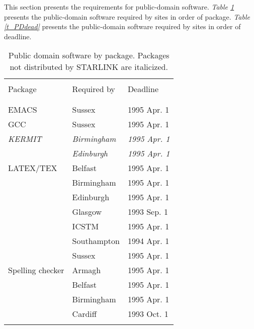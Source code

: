 This section presents the requirements for public-domain software.
{\em Table \ref{t_PDpack}} presents the public-domain software required by
sites in order of package.
{\em Table \ref{t_PDdead}} presents the public-domain software required by
sites in order of deadline.

\begin{table}
\begin{center}
\caption{Public domain software by package.
Packages not distributed by STARLINK are italicized.}
\vspace{5mm}
\begin{tabular}{|p{36mm}|p{50mm}|p{30mm}|} \hline \label{t_PDpack}
& & \\
Package & Required by & Deadline \\
& & \\ \hline
& & \\
EMACS            & Sussex           & 1995 Apr. 1 \\
GCC              & Sussex           & 1995 Apr. 1 \\
{\em KERMIT}     & {\em Birmingham} & {\em 1995 Apr. 1} \\
                 & {\em Edinburgh}  & {\em 1995 Apr. 1} \\
LATEX/TEX        & Belfast          & 1995 Apr. 1 \\
                 & Birmingham       & 1995 Apr. 1 \\
                 & Edinburgh        & 1995 Apr. 1 \\
                 & Glasgow          & 1993 Sep. 1 \\
                 & ICSTM            & 1995 Apr. 1 \\
                 & Southampton      & 1994 Apr. 1 \\
                 & Sussex           & 1995 Apr. 1 \\
Spelling checker & Armagh           & 1995 Apr. 1 \\
                 & Belfast          & 1995 Apr. 1 \\
                 & Birmingham       & 1995 Apr. 1 \\
                 & Cardiff          & 1993 Oct. 1 \\
& & \\ \hline
\end{tabular}
\end{center}
\end{table}


